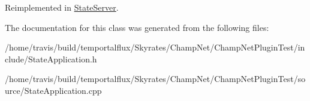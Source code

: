 Reimplemented in \hyperlink{class_state_server_aceb9a260a5c4a4d46607e8fe71be2667}{State\-Server}.



The documentation for this class was generated from the following files\-:\begin{DoxyCompactItemize}
\item 
/home/travis/build/temportalflux/\-Skyrates/\-Champ\-Net/\-Champ\-Net\-Plugin\-Test/include/State\-Application.\-h\item 
/home/travis/build/temportalflux/\-Skyrates/\-Champ\-Net/\-Champ\-Net\-Plugin\-Test/source/State\-Application.\-cpp\end{DoxyCompactItemize}
